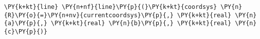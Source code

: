 \begin{Verbatim}[commandchars=\\\{\}]
    \PY{k+kt}{line} \PY{n+nf}{line}\PY{p}{(}\PY{k+kt}{coordsys} \PY{n}{R}\PY{o}{=}\PY{n+nv}{currentcoordsys}\PY{p}{,} \PY{k+kt}{real} \PY{n}{a}\PY{p}{,} \PY{k+kt}{real} \PY{n}{b}\PY{p}{,} \PY{k+kt}{real} \PY{n}{c}\PY{p}{)}
\end{Verbatim}
